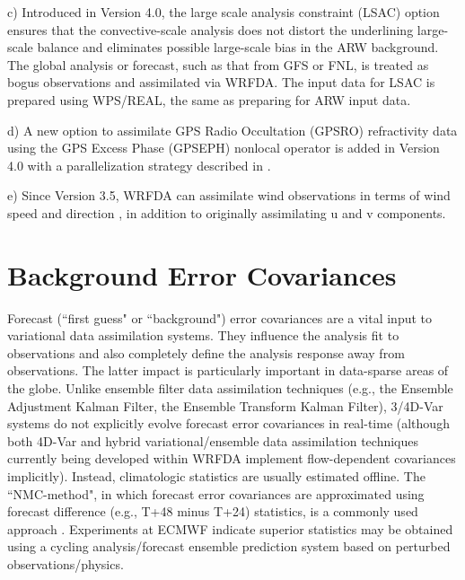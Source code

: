 \vspace{0.5cm}

c) Introduced in Version 4.0, the large scale analysis constraint (LSAC) option \citep{ven16} ensures that the convective-scale 
analysis does not distort the underlining large-scale balance and eliminates possible large-scale bias in the ARW background. The global analysis or forecast, such as that from GFS or FNL, is treated as bogus observations and assimilated via WRFDA. The input data for LSAC is prepared using WPS/REAL, the same as preparing for ARW input data.

\vspace{0.5cm}

d) A new option to assimilate GPS Radio Occultation (GPSRO) refractivity data using the GPS Excess Phase (GPSEPH)
nonlocal operator \citep{chen09} is added in Version 4.0 with a parallelization strategy described in \citep{zhang14b}.

\vspace{0.5cm}

e) Since Version 3.5, WRFDA can assimilate wind observations in terms of wind speed and direction \citep{huang13,gao15}, 
in addition to originally assimilating u and v components.

\section{Background Error Covariances}
\label{var-be}

Forecast (``first guess" or ``background") error covariances are a vital input to variational 
data assimilation systems. They influence the analysis fit to observations and also 
completely define the analysis response away from observations. The latter impact is 
particularly important in data-sparse areas of the globe. Unlike ensemble filter data 
assimilation techniques (e.g., the Ensemble Adjustment Kalman Filter, the Ensemble 
Transform Kalman Filter), 3/4D-Var systems do not explicitly evolve forecast error 
covariances in real-time (although both 4D-Var and hybrid variational/ensemble data assimilation techniques currently being developed within WRFDA implement flow-dependent covariances implicitly). Instead, climatologic statistics are usually estimated offline. 
The ``NMC-method", in which forecast error covariances are approximated using 
forecast difference (e.g., T+48 minus T+24) statistics, is a commonly used approach 
\citep{parrish92}. Experiments at ECMWF \citep{fisher03} indicate superior statistics may 
be obtained using a cycling analysis/forecast ensemble prediction
system based on perturbed observations/physics.

